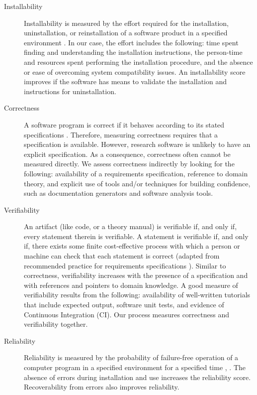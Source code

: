 \documentclass[final, 3p, times, authoryear]{elsarticle}
\begin{document}
\begin{description}

	\item[Installability] Installability is measured by the effort required for
	the installation, uninstallation, or reinstallation of a software product in
	a specified environment \citep{ISO/IEC25010, lenhard2013measuring}. In our
	case, the effort includes the following: time spent finding and
	understanding the installation instructions, the person-time and resources
	spent performing the installation procedure, and the absence or ease of
	overcoming system compatibility issues. An installability score improves if
	the software has means to validate the installation and instructions for
	uninstallation.

	\item[Correctness] A software program is correct if it behaves according to
	its stated specifications \citep[p.\ 17]{GhezziEtAl2003}. Therefore,
	measuring correctness requires that a specification is available. However,
	research software is unlikely to have an explicit specification. As a
	consequence, correctness often cannot be measured directly. We assess
	correctness indirectly by looking for the following: availability of a
	requirements specification, reference to domain theory, and explicit use of
	tools and/or techniques for building confidence, such as documentation
	generators and software analysis tools.

	\item[Verifiability] An artifact (like code, or a theory manual) is
	verifiable if, and only if, every statement therein is verifiable. A
	statement is verifiable if, and only if, there exists some finite
	cost-effective process with which a person or machine can check that each
	statement is correct (adapted from recommended practice for requirements
	specifications \citep{IEEE1998}). Similar to correctness, verifiability
	increases with the presence of a specification and with references and
	pointers to domain knowledge. A good measure of verifiability results from
	the following: availability of well-written tutorials that include expected
	output, software unit tests, and evidence of Continuous Integration (CI).
	Our process measures correctness and verifiability together.

	\item[Reliability] Reliability is measured by the probability of
	failure-free operation of a computer program in a specified environment for
	a specified time \citep[p.\ 357]{GhezziEtAl2003}, \citep{musa1987software}.
	The absence of errors during installation and use increases the reliability
	score. Recoverability from errors also improves reliability.


\end{description}
\end{document}
